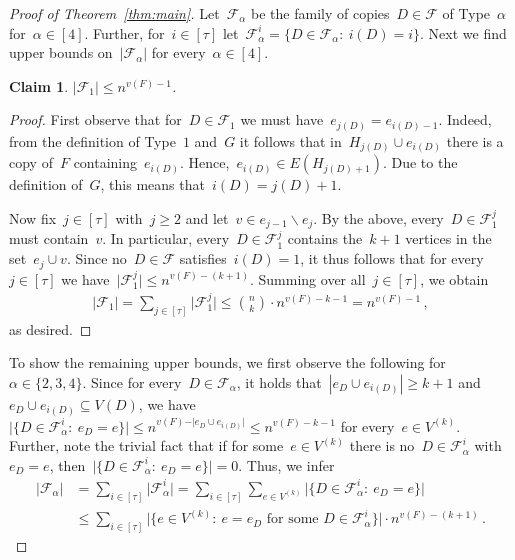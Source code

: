 \documentclass[reqno, 12pt]{amsart}
\numberwithin{equation}{section}
\numberwithin{figure}{section}
\let\setminus=\smallsetminus
\newcommand{\cF}{\mathcal{F}}
\theoremstyle{plain}
\newtheorem{claim}[theorem]{Claim}
\theoremstyle{note}
\theoremstyle{remark}
\begin{document}
\begin{proof}[Proof of Theorem~\ref{thm:main}]
    Let~$\cF_{\alpha}$ be the family of copies~$D\in \cF$ of Type~$\alpha$ for~$\alpha\in[4]$.
    Further, for~$i\in[\tau]$ let~$\cF_{\alpha}^i=\{D\in\cF_{\alpha}:\:i(D)=i\}$.
    Next we find upper bounds on~$\vert\cF_{\alpha}\vert$ for every~$\alpha\in[4]$.

    \begin{claim}\label{cl:F1}
        $\vert \cF_1\vert\leq n^{v(F)-1}$.
    \end{claim}

    \begin{proof}
        First observe that for~$D \in \cF_1$ we must have~$e_{j(D)} = e_{i(D)-1}$.
        Indeed, from the definition of Type~$1$ and~$G$ it follows that in~$H_{j(D)}\cup e_{i(D)}$ there is a copy of~$F$ containing~$e_{i(D)}$.
        Hence,~$e_{i(D)}\in E(H_{j(D)+1})$.
        Due to the definition of~$G$, this means that~$i(D)=j(D)+1$.
        
        Now fix~$j\in[\tau]$ with~$j\geq2$ and let~$v \in e_{j-1} \setminus e_j$. 
        By the above, every~$D \in \mathcal{F}_1^j$ must contain~$v$. 
        In particular, every~$D\in\cF_1^j$ contains the~$k+1$ vertices in the set~$e_j\cup v$.
        Since no~$D\in\cF$ satisfies~$i(D)=1$, it thus follows that for every~$j\in[\tau]$ we have~$
        \vert\cF_1^j\vert\leq n^{v(F)-(k+1)}$. 
        Summing over all~$j\in[\tau]$, we obtain
        \begin{align*}
            \vert\mathcal{F}_1\vert=\sum_{j\in[\tau]} \vert\cF_1^j\vert\leq \binom{n}{k} \cdot n^{v(F)-k-1}= n^{v(F)-1}\,,
        \end{align*}
        as desired.
    \end{proof}
    
    To show the remaining upper bounds, we first observe the following for~$\alpha\in\{2,3,4\}$.
    Since for every~$D\in\cF_{\alpha}$, it holds that~$|e_D \cup e_{i(D)}|\geq k+1$ and~$e_D \cup e_{i(D)}\subseteq V(D)$, we have~$\vert\{D\in\cF_{\alpha}^i:\:e_D=e\}\vert\leq n^{v(F)-\vert e_D\cup e_{i(D)}\vert}\leq n^{v(F)-k-1}$ for every~$e\in V^{(k)}$.
    Further, note the trivial fact that if for some~$e\in V^{(k)}$ there is no~$D\in\cF_{\alpha}^i$ with~$e_D=e$, then~$\vert\{D\in\cF_{\alpha}^i:\:e_D=e\}\vert=0$.
    Thus, we infer
    \begin{align}\label{eq:generalupper}
        |\cF_{\alpha}|&=\sum_{i\in[\tau]}\vert\cF_{\alpha}^i\vert=\sum_{i \in [\tau]} \sum_{e\in V^{(k)}}\vert\{D\in\cF_{\alpha}^i:\:e_D=e\}\vert\nonumber\\
        &\leq\sum_{i \in [\tau]}\big\vert\{e\in V^{(k)}:\:e=e_D\text{ for some }D\in\cF_{\alpha}^i\}\big\vert \cdot n^{v(F) - (k+1)}\,.
    \end{align}


\end{proof}
\end{document}
